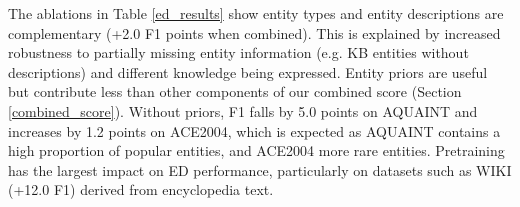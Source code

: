 \documentclass[11pt]{article}
\begin{document}
The ablations in Table \ref{ed_results} show entity types and entity descriptions are complementary (+2.0 F1 points when combined). This is explained by increased robustness to partially missing entity information (e.g. KB entities without descriptions) and different knowledge being expressed. Entity priors are useful but contribute less than other components of our combined score (Section \ref{combined_score}). Without priors, F1 falls by 5.0 points on AQUAINT and increases by 1.2 points on ACE2004, which is expected as AQUAINT contains a high proportion of popular entities, and ACE2004 more rare entities. Pretraining has the largest impact on ED performance, particularly on datasets such as WIKI (+12.0 F1) derived from encyclopedia text.
\begin{table}[h]
\centering

\label{ppr_results}
\caption{ED accuracy on AIDA-CoNLL using PPRForNED candidates.}
\label{ppr_results}
\end{table}
\end{document}
